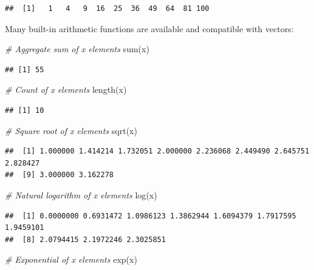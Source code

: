 \documentclass[
]{book}
\newenvironment{Shaded}{\begin{snugshade}}{\end{snugshade}}
\newcommand{\CommentTok}[1]{\textcolor[rgb]{0.56,0.35,0.01}{\textit{#1}}}
\newcommand{\FunctionTok}[1]{\textcolor[rgb]{0.00,0.00,0.00}{#1}}
\newcommand{\NormalTok}[1]{#1}
\begin{document}
\begin{verbatim}
##  [1]   1   4   9  16  25  36  49  64  81 100
\end{verbatim}

Many built-in arithmetic functions are available and compatible with vectors:

\begin{Shaded}
\begin{Highlighting}[]
\CommentTok{\# Aggregate sum of x elements}
\FunctionTok{sum}\NormalTok{(x)}
\end{Highlighting}
\end{Shaded}

\begin{verbatim}
## [1] 55
\end{verbatim}

\begin{Shaded}
\begin{Highlighting}[]
\CommentTok{\# Count of x elements}
\FunctionTok{length}\NormalTok{(x)}
\end{Highlighting}
\end{Shaded}

\begin{verbatim}
## [1] 10
\end{verbatim}

\begin{Shaded}
\begin{Highlighting}[]
\CommentTok{\# Square root of x elements}
\FunctionTok{sqrt}\NormalTok{(x)}
\end{Highlighting}
\end{Shaded}

\begin{verbatim}
##  [1] 1.000000 1.414214 1.732051 2.000000 2.236068 2.449490 2.645751 2.828427
##  [9] 3.000000 3.162278
\end{verbatim}

\begin{Shaded}
\begin{Highlighting}[]
\CommentTok{\# Natural logarithm of x elements}
\FunctionTok{log}\NormalTok{(x)}
\end{Highlighting}
\end{Shaded}

\begin{verbatim}
##  [1] 0.0000000 0.6931472 1.0986123 1.3862944 1.6094379 1.7917595 1.9459101
##  [8] 2.0794415 2.1972246 2.3025851
\end{verbatim}

\begin{Shaded}
\begin{Highlighting}[]
\CommentTok{\# Exponential of x elements}
\FunctionTok{exp}\NormalTok{(x)}
\end{Highlighting}
\end{Shaded}
\end{document}
